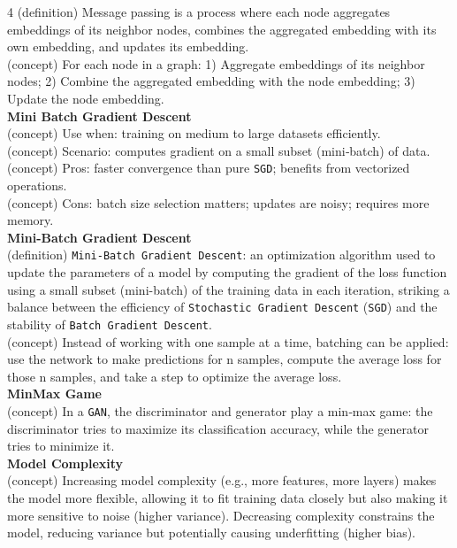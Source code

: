 \documentclass[8pt]{extarticle}
\begin{document}
\begin{multicols}{4}
(definition) Message passing is a process where each node aggregates embeddings of its neighbor nodes, combines the aggregated embedding with its own embedding, and updates its embedding.\\
(concept) For each node in a graph: 1) Aggregate embeddings of its neighbor nodes; 2) Combine the aggregated embedding with the node embedding; 3) Update the node embedding.\\
\vspace{2pt}\textbf{Mini Batch Gradient Descent}\\
(concept) Use when: training on medium to large datasets efficiently.\\
(concept) Scenario: computes gradient on a small subset (mini‑batch) of data.\\
(concept) Pros: faster convergence than pure \texttt{SGD}; benefits from vectorized operations.\\
(concept) Cons: batch size selection matters; updates are noisy; requires more memory.\\
\vspace{2pt}\textbf{Mini-Batch Gradient Descent}\\
(definition) \texttt{Mini-Batch Gradient Descent}: an optimization algorithm used to update the parameters of a model by computing the gradient of the loss function using a small subset (mini-batch) of the training data in each iteration, striking a balance between the efficiency of \texttt{Stochastic Gradient Descent} (\texttt{SGD}) and the stability of \texttt{Batch Gradient Descent}.\\
(concept) Instead of working with one sample at a time, batching can be applied: use the network to make predictions for n samples, compute the average loss for those n samples, and take a step to optimize the average loss.\\
\vspace{2pt}\textbf{MinMax Game}\\
(concept) In a \texttt{GAN}, the discriminator and generator play a min‑max game: the discriminator tries to maximize its classification accuracy, while the generator tries to minimize it.\\
\vspace{2pt}\textbf{Model Complexity}\\
(concept) Increasing model complexity (e.g., more features, more layers) makes the model more flexible, allowing it to fit training data closely but also making it more sensitive to noise (higher variance). Decreasing complexity constrains the model, reducing variance but potentially causing underfitting (higher bias).\\

\end{multicols}
\end{document}
